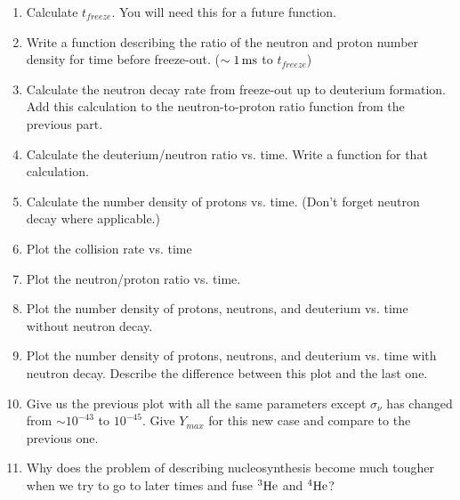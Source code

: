 \documentclass[12pt,preprint]{aastex}
\def\ms{\,{\rm ms}}
\begin{document}
\begin{enumerate}
\begin{enumerate}
	\item Calculate $t_{freeze}$. You will need this for a future function.
	 
	\item Write a function describing the ratio of the neutron and proton number density for time before freeze-out. ($\sim 1\ms$ to $t_{freeze}$) 
	
	\item Calculate the neutron decay rate from freeze-out up to deuterium formation. Add this calculation to the neutron-to-proton ratio function from the previous part. 
	
	\item Calculate the deuterium/neutron ratio vs. time. Write a function for that calculation. 
	
	\item Calculate the number density of protons vs. time. (Don't forget neutron decay where applicable.) 
	
	\item Plot the collision rate vs. time
	
	\item Plot the neutron/proton ratio vs. time. 
	
	\item Plot the number density of protons, neutrons, and deuterium vs. time without neutron decay.
	
	\item Plot the number density of protons, neutrons, and deuterium vs. time with neutron decay. Describe the difference between this plot and the last one.
	
	\item Give us the previous plot with all the same parameters except $\sigma_{\nu}$ has changed from $\sim 10^{-43}$ to $10^{-45}$. Give $Y_{max}$ for this new case and compare to the previous one.
	
	\item Why does the problem of describing nucleosynthesis become much tougher when we try to go to later times and fuse $\rm{^3He}$ and $\rm{^4He}$? 

\end{enumerate}

\end{enumerate}
\end{document}
